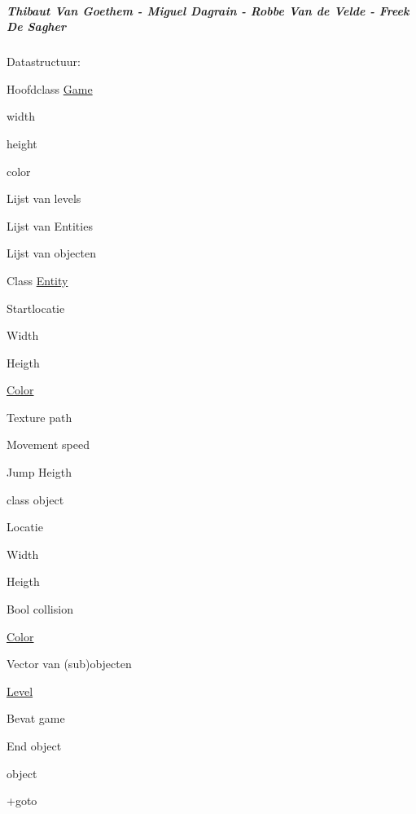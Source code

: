 \subparagraph*{Thibaut Van Goethem -\/ Miguel Dagrain -\/ Robbe Van de Velde -\/ Freek De Sagher}

Datastructuur\+: ~\newline

\begin{DoxyItemize}
\item Hoofdclass \hyperlink{classGame}{Game}
\begin{DoxyItemize}
\item width 
\item height 
\item color 
\item Lijst van levels 
\item Lijst van Entities 
\item Lijst van objecten 
\end{DoxyItemize}
\item Class \hyperlink{classEntity}{Entity}
\begin{DoxyItemize}
\item Startlocatie 
\item Width 
\item Heigth 
\item \hyperlink{structColor}{Color} 
\item Texture path 
\item Movement speed 
\item Jump Heigth 
\end{DoxyItemize}
\item class object
\begin{DoxyItemize}
\item Locatie 
\item Width 
\item Heigth 
\item Bool collision 
\item \hyperlink{structColor}{Color} 
\item Vector van (sub)objecten 
\end{DoxyItemize}
\item \hyperlink{classLevel}{Level}
\begin{DoxyItemize}
\item Bevat game 
\item End object
\begin{DoxyItemize}
\item object 
\item +goto 
\end{DoxyItemize}
\end{DoxyItemize}
\end{DoxyItemize}